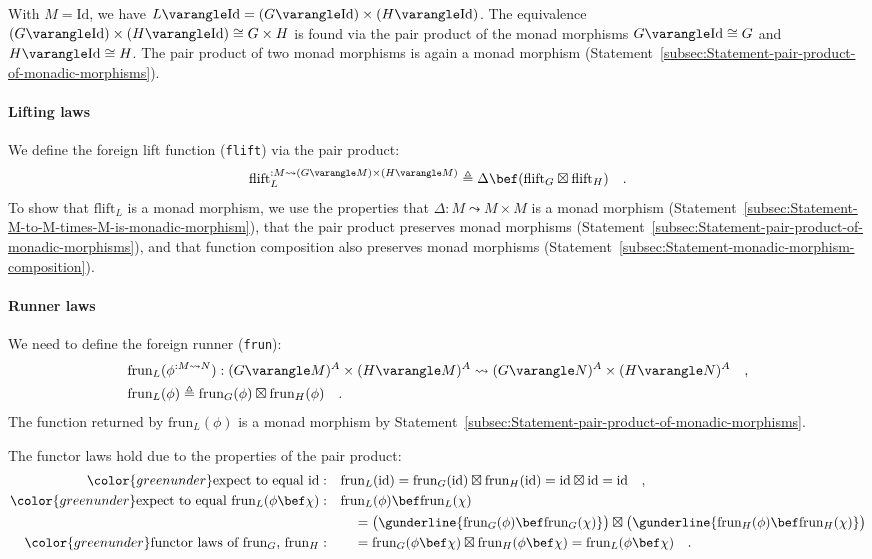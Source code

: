 With $M=\text{Id}$, we have $L\varangle\text{Id}=(G\varangle\text{Id})\times(H\varangle\text{Id})$.
The equivalence $(G\varangle\text{Id})\times(H\varangle\text{Id})\cong G\times H$
is found via the pair product of the monad morphisms $G\varangle\text{Id}\cong G$
and $H\varangle\text{Id}\cong H$. The pair product of two monad morphisms
is again a monad morphism (Statement~\ref{subsec:Statement-pair-product-of-monadic-morphisms}).

\paragraph{Lifting laws}

We define the foreign lift function (\lstinline!flift!) via the pair
product:
\[
\text{flift}_{L}^{:M\leadsto(G\varangle M)\times(H\varangle M)}\triangleq\Delta\bef(\text{flift}_{G}\boxtimes\text{flift}_{H})\quad.
\]
To show that $\text{flift}_{L}$ is a monad morphism, we use the properties
that $\Delta:M\leadsto M\times M$ is a monad morphism (Statement~\ref{subsec:Statement-M-to-M-times-M-is-monadic-morphism}),
that the pair product preserves monad morphisms (Statement~\ref{subsec:Statement-pair-product-of-monadic-morphisms}),
and that function composition also preserves monad morphisms (Statement~\ref{subsec:Statement-monadic-morphism-composition}).

\paragraph{Runner laws}

We need to define the foreign runner (\lstinline!frun!):
\begin{align*}
 & \text{frun}_{L}(\phi^{:M\leadsto N}):(G\varangle M)^{A}\times(H\varangle M)^{A}\leadsto(G\varangle N)^{A}\times(H\varangle N)^{A}\quad,\\
 & \text{frun}_{L}(\phi)\triangleq\text{frun}_{G}(\phi)\boxtimes\text{frun}_{H}(\phi)\quad.
\end{align*}
The function returned by $\text{frun}_{L}(\phi)$ is a monad morphism
by Statement~\ref{subsec:Statement-pair-product-of-monadic-morphisms}.

The functor laws hold due to the properties of the pair product:
\begin{align*}
{\color{greenunder}\text{expect to equal }\text{id}:}\quad & \text{frun}_{L}(\text{id})=\text{frun}_{G}(\text{id})\boxtimes\text{frun}_{H}(\text{id})=\text{id}\boxtimes\text{id}=\text{id}\quad,\\
{\color{greenunder}\text{expect to equal }\text{frun}_{L}(\phi\bef\chi):}\quad & \text{frun}_{L}(\phi)\bef\text{frun}_{L}(\chi)\\
 & \quad=\big(\gunderline{\text{frun}_{G}(\phi)\bef\text{frun}_{G}(\chi)}\big)\boxtimes\big(\gunderline{\text{frun}_{H}(\phi)\bef\text{frun}_{H}(\chi)}\big)\\
{\color{greenunder}\text{functor laws of }\text{frun}_{G},\,\text{frun}_{H}:}\quad & \quad=\text{frun}_{G}(\phi\bef\chi)\boxtimes\text{frun}_{H}(\phi\bef\chi)=\text{frun}_{L}(\phi\bef\chi)\quad.
\end{align*}


